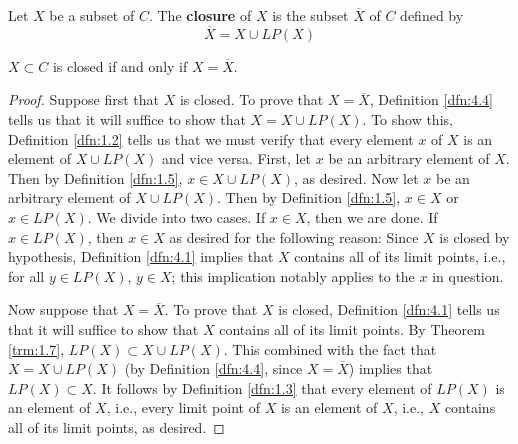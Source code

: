 \documentclass[../main.tex]{subfiles}
\begin{document}
\begin{definition}\label{dfn:4.4}
    Let $X$ be a subset of $C$. The \textbf{closure} of $X$ is the subset $\overline{X}$ of $C$ defined by
    \begin{equation*}
        \overline{X} = X\cup LP(X)
    \end{equation*}
\end{definition}

\begin{theorem}\label{trm:4.5}
    $X\subset C$ is closed if and only if $X=\overline{X}$.
    \begin{proof}
        Suppose first that $X$ is closed. To prove that $X=\overline{X}$, Definition \ref{dfn:4.4} tells us that it will suffice to show that $X=X\cup LP(X)$. To show this, Definition \ref{dfn:1.2} tells us that we must verify that every element $x$ of $X$ is an element of $X\cup LP(X)$ and vice versa. First, let $x$ be an arbitrary element of $X$. Then by Definition \ref{dfn:1.5}, $x\in X\cup LP(X)$, as desired. Now let $x$ be an arbitrary element of $X\cup LP(X)$. Then by Definition \ref{dfn:1.5}, $x\in X$ or $x\in LP(X)$. We divide into two cases. If $x\in X$, then we are done. If $x\in LP(X)$, then $x\in X$ as desired for the following reason: Since $X$ is closed by hypothesis, Definition \ref{dfn:4.1} implies that $X$ contains all of its limit points, i.e., for all $y\in LP(X)$, $y\in X$; this implication notably applies to the $x$ in question.\par
        Now suppose that $X=\overline{X}$. To prove that $X$ is closed, Definition \ref{dfn:4.1} tells us that it will suffice to show that $X$ contains all of its limit points. By Theorem \ref{trm:1.7}, $LP(X)\subset X\cup LP(X)$. This combined with the fact that $X=X\cup LP(X)$ (by Definition \ref{dfn:4.4}, since $X=\overline{X}$) implies that $LP(X)\subset X$. It follows by Definition \ref{dfn:1.3} that every element of $LP(X)$ is an element of $X$, i.e., every limit point of $X$ is an element of $X$, i.e., $X$ contains all of its limit points, as desired.
    \end{proof}
\end{theorem}
\end{document}
